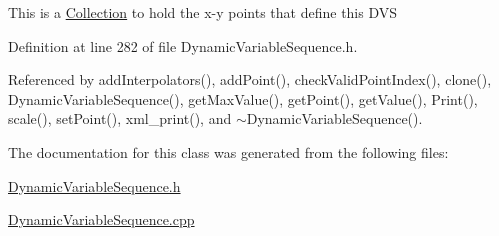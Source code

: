 This is a \hyperlink{classCollection}{Collection} to hold the x-y points that define this DVS 

Definition at line 282 of file Dynamic\-Variable\-Sequence.h.

Referenced by add\-Interpolators(), add\-Point(), check\-Valid\-Point\-Index(), clone(), Dynamic\-Variable\-Sequence(), get\-Max\-Value(), get\-Point(), get\-Value(), Print(), scale(), set\-Point(), xml\_\-print(), and $\sim$Dynamic\-Variable\-Sequence().

The documentation for this class was generated from the following files:\begin{CompactItemize}
\item 
\hyperlink{DynamicVariableSequence_8h}{Dynamic\-Variable\-Sequence.h}\item 
\hyperlink{DynamicVariableSequence_8cpp}{Dynamic\-Variable\-Sequence.cpp}\end{CompactItemize}
